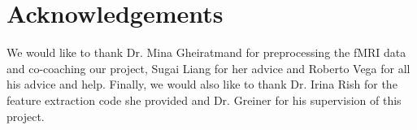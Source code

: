 \documentclass{article} %
\begin{document}
\section{Acknowledgements}
We would like to thank Dr. Mina Gheiratmand for preprocessing the fMRI data 
and co-coaching our project, Sugai Liang for her advice and Roberto Vega for
all his advice and help. Finally, we would also like to thank Dr. Irina Rish
for the feature extraction code she provided and Dr. Greiner for his
supervision of this project.




	
\end{document}
